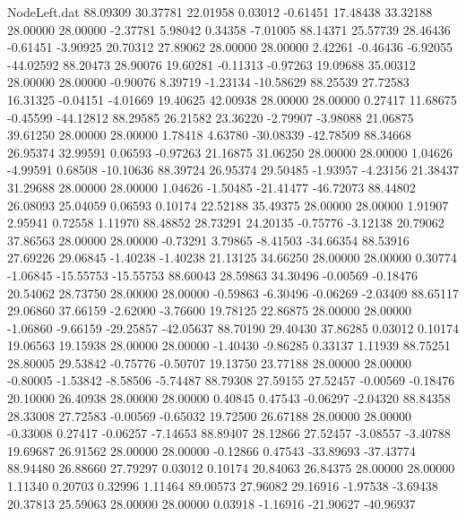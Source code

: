 \begin{filecontents}{NodeLeft.dat}
  88.09309   30.37781   22.01958     0.03012   -0.61451   17.48438   33.32188   28.00000   28.00000   -2.37781    5.98042    0.34358   -7.01005
  88.14371   25.57739   28.46436    -0.61451   -3.90925   20.70312   27.89062   28.00000   28.00000    2.42261   -0.46436   -6.92055  -44.02592
  88.20473   28.90076   19.60281    -0.11313   -0.97263   19.09688   35.00312   28.00000   28.00000   -0.90076    8.39719   -1.23134  -10.58629
  88.25539   27.72583   16.31325    -0.04151   -4.01669   19.40625   42.00938   28.00000   28.00000    0.27417   11.68675   -0.45599  -44.12812
  88.29585   26.21582   23.36220    -2.79907   -3.98088   21.06875   39.61250   28.00000   28.00000    1.78418    4.63780  -30.08339  -42.78509
  88.34668   26.95374   32.99591     0.06593   -0.97263   21.16875   31.06250   28.00000   28.00000    1.04626   -4.99591    0.68508  -10.10636
  88.39724   26.95374   29.50485    -1.93957   -4.23156   21.38437   31.29688   28.00000   28.00000    1.04626   -1.50485  -21.41477  -46.72073
  88.44802   26.08093   25.04059     0.06593    0.10174   22.52188   35.49375   28.00000   28.00000    1.91907    2.95941    0.72558    1.11970
  88.48852   28.73291   24.20135    -0.75776   -3.12138   20.79062   37.86563   28.00000   28.00000   -0.73291    3.79865   -8.41503  -34.66354
  88.53916   27.69226   29.06845    -1.40238   -1.40238   21.13125   34.66250   28.00000   28.00000    0.30774   -1.06845  -15.55753  -15.55753
  88.60043   28.59863   34.30496    -0.00569   -0.18476   20.54062   28.73750   28.00000   28.00000   -0.59863   -6.30496   -0.06269   -2.03409
  88.65117   29.06860   37.66159    -2.62000   -3.76600   19.78125   22.86875   28.00000   28.00000   -1.06860   -9.66159  -29.25857  -42.05637
  88.70190   29.40430   37.86285     0.03012    0.10174   19.06563   19.15938   28.00000   28.00000   -1.40430   -9.86285    0.33137    1.11939
  88.75251   28.80005   29.53842    -0.75776   -0.50707   19.13750   23.77188   28.00000   28.00000   -0.80005   -1.53842   -8.58506   -5.74487
  88.79308   27.59155   27.52457    -0.00569   -0.18476   20.10000   26.40938   28.00000   28.00000    0.40845    0.47543   -0.06297   -2.04320
  88.84358   28.33008   27.72583    -0.00569   -0.65032   19.72500   26.67188   28.00000   28.00000   -0.33008    0.27417   -0.06257   -7.14653
  88.89407   28.12866   27.52457    -3.08557   -3.40788   19.69687   26.91562   28.00000   28.00000   -0.12866    0.47543  -33.89693  -37.43774
  88.94480   26.88660   27.79297     0.03012    0.10174   20.84063   26.84375   28.00000   28.00000    1.11340    0.20703    0.32996    1.11464
  89.00573   27.96082   29.16916    -1.97538   -3.69438   20.37813   25.59063   28.00000   28.00000    0.03918   -1.16916  -21.90627  -40.96937

\end{filecontents}
